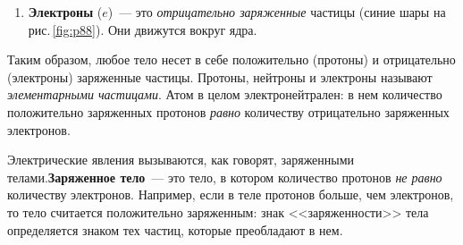 \documentclass[main.tex]{subfiles}
\begin{document}
\begin{NoHyper}
\begin{enumerate}
    Наличие протонов в ядре делает его положительно заряженной частицей.
    \item \textbf{Электроны} ($e$)~--- это \emph{отрицательно заряженные} частицы (синие шары на рис.\,\ref{fig:p88}). Они движутся вокруг ядра.
\end{enumerate}

Таким образом, любое тело несет в себе положительно (протоны) и отрицательно (электроны) заряженные частицы. Протоны, нейтроны и электроны называют \emph{элементарными частицами}. Атом в целом электронейтрален: в нем количество положительно заряженных протонов \emph{равно} количеству отрицательно заряженных электронов.

Электрические явления вызываются, как говорят, заряженными телами.\linebreak \textbf{Заряженное тело}~--- это тело, в котором количество протонов \emph{не равно} количеству электронов. Например, если в теле протонов больше, чем электронов, то тело считается положительно заряженным: знак <<заряженности>> тела определяется знаком тех частиц, которые преобладают в нем. 
















\end{NoHyper}
\end{document}
